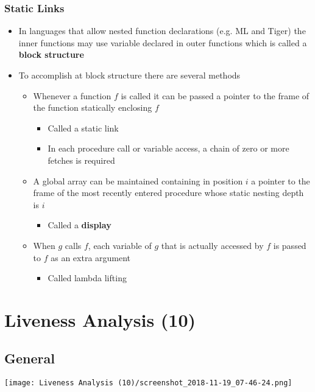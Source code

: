 \documentclass[11pt]{article}
\begin{document}
\subsubsection{Static Links}
\label{sec:org70494ed}
\begin{itemize}
\item In languages that allow nested function declarations (e.g. ML and Tiger) the inner functions may use variable declared in outer functions which is called a \textbf{block structure}
\item To accomplish at block structure there are several methods
\begin{itemize}
\item Whenever a function \(f\) is called it can be passed a pointer to the frame of the function statically enclosing \(f\)
\begin{itemize}
\item Called a static link
\item In each procedure call or variable access, a chain of zero or more fetches is required
\end{itemize}
\item A global array can be maintained containing in position \(i\) a pointer to the frame of the most recently entered procedure whose static nesting depth is \(i\)
\begin{itemize}
\item Called a \textbf{display}
\end{itemize}
\item When \(g\) calls \(f\), each variable of \(g\) that is actually accessed by \(f\) is passed to \(f\) as an extra argument
\begin{itemize}
\item Called lambda lifting
\end{itemize}
\end{itemize}
\end{itemize}

\section{Liveness Analysis (10)}
\label{sec:org111178d}
\subsection{General}
\label{sec:org2a41f71}
\begin{center}
\texttt{[image: Liveness Analysis (10)/screenshot\_2018-11-19\_07-46-24.png]}
\end{center}
\end{document}
